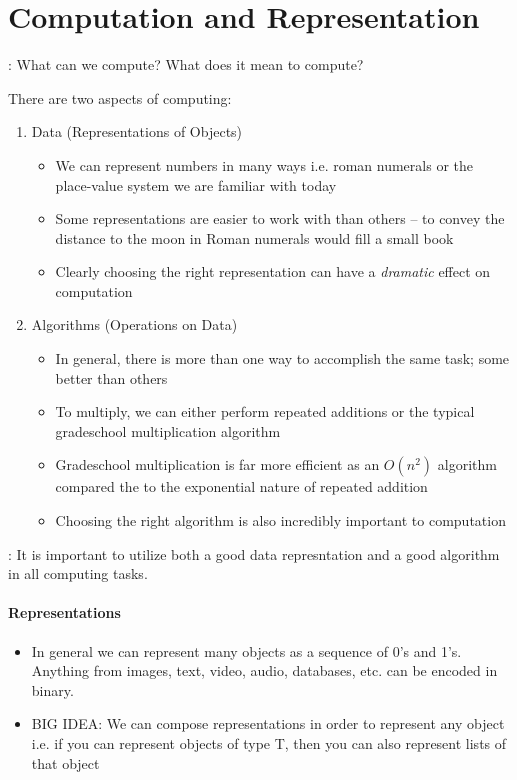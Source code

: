 \chapter{Computation and Representation}

: What can we compute? What does it mean to compute?

\vspace*{0.5cm}

There are two aspects of computing: 
\begin{enumerate}
    \item Data (Representations of Objects)
    \begin{itemize}
        \item We can represent numbers in many ways i.e. roman numerals or the place-value system we are familiar with today
        \item Some representations are easier to work with than others -- to convey the distance to the moon in Roman numerals would fill a small book
        \item Clearly choosing the right representation can have a \emph{dramatic} effect on computation
    \end{itemize}
    \item Algorithms (Operations on Data)
    \begin{itemize}
        \item In general, there is more than one way to accomplish the same task; some better than others
        \item To multiply, we can either perform repeated additions or the typical gradeschool multiplication algorithm
        \item Gradeschool multiplication is far more efficient as an $O(n^2)$ algorithm compared the to the exponential nature of repeated addition
        \item Choosing the right algorithm is also incredibly important to computation 
    \end{itemize}
\end{enumerate}
: It is important to utilize both a good data represntation and a good algorithm in all computing tasks.

\vspace*{0.5cm}

\subsubsection*{Representations}
\begin{itemize}
    \item In general we can represent many objects as a sequence of 0's and 1's. Anything from images, text, video, audio, databases, etc. can be encoded in binary.
    \item BIG IDEA: We can compose representations in order to represent any object i.e. if you can represent objects of type T, then you can also represent lists of that object
\end{itemize}

